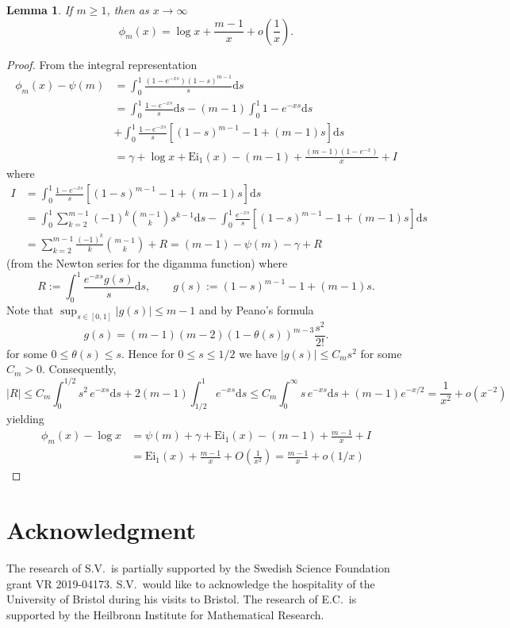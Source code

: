 \documentclass[12pt]{article}
\newtheorem{lemma}{Lemma}
\newcommand{\1}{\mathbf{1}}
\begin{document}
\begin{lemma}\label{lem:phiasympt}
If $m\ge 1$, then as $x\to\infty$
$$
\phi_m(x)=\log x+\frac{m-1}{x}+o\left(\frac1x\right).
$$
\end{lemma}
\begin{proof}
From the integral representation 
\begin{align*}
\phi_m(x) -\psi(m)&=\int_0^1\frac{(1-e^{-xs})(1-s)^{m-1}}{s}\mathrm{d}s
\\ &=
\int_0^1 \frac{1-e^{-xs}}{s}\mathrm{d}s
-(m-1)\int_0^1 1-e^{-xs}\mathrm{d}s
\\ &
+\int_0^1 \frac{1-e^{-xs}}{s}\left[(1-s)^{m-1}-1+(m-1)s\right]\mathrm{d}s
\\ &=\gamma+\log x+\mathrm{Ei}_1(x)-(m-1)+\frac{(m-1)(1-e^{-x})}x+I
\end{align*}
where
\begin{align*}
I&=\int_0^1 \frac{1-e^{-xs}}{s}\left[(1-s)^{m-1}-1+(m-1)s\right]\mathrm{d}s
\\ &=
\int_0^1 \sum_{k=2}^{m-1} (-1)^k\binom{m-1}{k}s^{k-1}\mathrm{d}s
-
\int_0^1 \frac{e^{-xs}}{s}\left[(1-s)^{m-1}-1+(m-1)s\right]\mathrm{d}s
\\ &=
\sum_{k=2}^{m-1} \frac{(-1)^k}k \binom{m-1}{k}
+ R
=(m-1)-\psi(m)-\gamma+ R
\end{align*}
(from the Newton series for the digamma function) where
$$
R:=\int_0^1 \frac{e^{-xs}g(s)}s\mathrm{d}s,
\qquad g(s):=(1-s)^{m-1}-1+(m-1)s.
$$
Note that $\sup_{s\in[0,1]} |g(s)|\le m-1$ and by Peano's formula 
$$
g(s)=(m-1)(m-2)(1-\theta(s))^{m-3}\frac{s^2}{2!}.
$$
for some  $0\le \theta(s)\le s$. Hence for $0\le s\le 1/2$
we have $|g(s)|\le C_m s^2 $ for some $C_m>0$.
Consequently,
$$
|R|\le C_m\int_0^{1/2} s^2\,e^{-xs} \mathrm{d}s
+2(m-1)\int_{1/2}^1 e^{-xs}\mathrm{d}s
\le 
 C_m \int_0^\infty s\, e^{-xs} \mathrm{d}s+(m-1)e^{-x/2}=\frac1{x^2}
+o(x^{-2})
$$
yielding
\begin{align*}  
\phi_m(x)-\log x&=\psi(m)+\gamma+ \mathrm{Ei}_1(x)-(m-1)+\frac{m-1}{x}+I
\\ &
=\mathrm{Ei}_1(x)+\frac{m-1}{x}+O\left(\frac1{x^2}\right)=\frac{m-1}{x}+o(1/x)
\end{align*}   
\end{proof}




\section*{Acknowledgment}
The research of S.V.\ is partially supported by the Swedish Science Foundation grant VR 2019-04173. S.V.~would like to acknowledge the hospitality of the University of Bristol during his visits to Bristol. The research of E.C.\ is supported by the Heilbronn Institute for Mathematical Research.  
\end{document}
